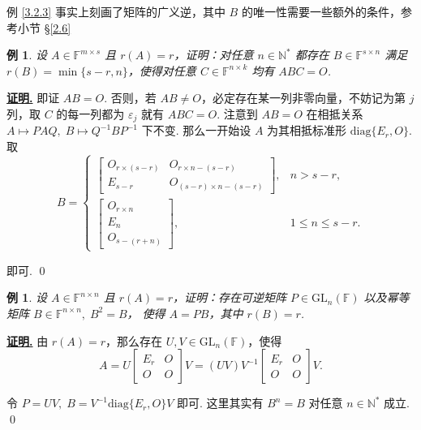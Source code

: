 \documentclass[10pt,openany]{article}
\theoremstyle{thmstyle} %
\theoremstyle{defstyle} %
\theoremstyle{prostyle} %
\theoremstyle{exastyle}
\newtheorem{example}[theorem]{例}
\theoremstyle{remstyle}
\renewenvironment{proof}[1][证明]{\par\underline{\textbf{#1.}} \;\fangsong}{\qed\par}
\newcommand{\F}{\mathbb{F}}
\newcommand{\gfn}{\text{GL}_n(\mathbb{F})}
\newcommand{\n}{^{n \times n}}
\newcommand{\diag}{\mathrm{diag}}
\begin{document}
例 \ref{3.2.3} 事实上刻画了矩阵的广义逆，其中 \( B \) 的唯一性需要一些额外的条件，参考小节 \S \ref{2.6}

\begin{example}
	设 \( A \in \F^{m \times s} \) 且 \( r(A)=r \)，证明：对任意 \( n \in \mathbb{N}^* \) 都存在 \( B \in \F^{s \times n} \) 满足 \( r(B)=\min\{s-r,n\} \)，使得对任意 \( C \in \F^{n \times k} \) 均有 \( ABC=O \).
\end{example}

\begin{proof}
	即证 \( AB=O \). 否则，若 \( AB \neq O \)，必定存在某一列非零向量，不妨记为第 \( j \) 列，取 \( C \) 的每一列都为 \( \varepsilon_j \) 就有 \( ABC=O \). 注意到 \( AB=O \) 在相抵关系 \( A \mapsto PAQ, \; B \mapsto Q^{-1}BP^{-1} \) 下不变. 那么一开始设 \( A \) 为其相抵标准形 \( \diag\{E_r,O\} \). 取
	\[ B=\left\{ \begin{array}{ll}
		\begin{bmatrix}
			O_{r \times (s-r)} & O_{r \times n-(s-r)} \\
			E_{s-r} & O_{(s-r) \times n-(s-r)}
		\end{bmatrix}, & n>s-r, \\[4ex]
		\begin{bmatrix}
			O_{r \times n} \\
			E_n \\
			O_{s-(r+n)}
		\end{bmatrix}, & 1 \leq n \leq s-r.
	\end{array}\right. \]
	
	即可.
\end{proof}

\begin{example} \label{3.2.5}
	设 \( A \in \F\n \) 且 \( r(A)=r \)，证明：存在可逆矩阵 \( P \in \gfn \) 以及幂等矩阵 \( B \in \F\n, \; B^2=B \)， 使得 \( A=PB \)，其中 \( r(B)=r \).
\end{example}

\begin{proof}
	由 \( r(A)=r \)，那么存在 \( U,V \in \gfn \)，使得 
	\[ A=U\begin{bmatrix}
		E_r & O \\ O & O
	\end{bmatrix}V=(UV)V^{-1}\begin{bmatrix}
	E_r & O \\ O & O
	\end{bmatrix}V. \]
	
	令 \( P=UV, \; B=V^{-1}\diag\{E_r,O\}V \) 即可. 这里其实有 \( B^n=B \) 对任意 \( n \in \mathbb{N}^* \) 成立.
\end{proof}
\end{document}
